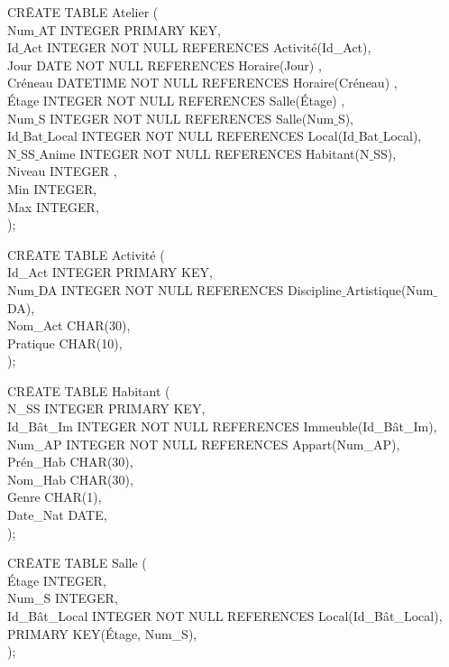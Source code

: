 \documentclass[a4paper,10.5pt]{report}
\begin{document}
		\begin{tabbing}
			CR\=EATE TABLE Atelier (\\
			\> Num$\_$AT INTEGER PRIMARY KEY,\\
			\> Id$\_$Act INTEGER NOT NULL REFERENCES Activité(Id\_Act),\\
            \> Jour DATE NOT NULL REFERENCES Horaire(Jour) ,\\
            \> Créneau DATETIME NOT NULL REFERENCES Horaire(Créneau) ,\\
            \> Étage INTEGER NOT NULL REFERENCES Salle(Étage) ,\\
			\> Num$\_$S INTEGER NOT NULL REFERENCES Salle(Num$\_$S),\\
			\> Id$\_$Bat$\_$Local INTEGER NOT NULL REFERENCES Local(Id$\_$Bat$\_$Local),\\
			\> N$\_$SS$\_$Anime  INTEGER NOT NULL REFERENCES Habitant(N$\_$SS),\\
			\> Niveau INTEGER ,\\
			\> Min INTEGER,\\
			\> Max INTEGER,\\);
		\end{tabbing}

		\begin{tabbing}
			CR\=EATE TABLE Activité (\\
			\> Id\_Act INTEGER PRIMARY KEY,\\
			\> Num$\_$DA INTEGER NOT NULL REFERENCES Discipline$\_$Artistique(Num$\_$DA),\\
			\> Nom\_Act CHAR(30),\\
			\> Pratique CHAR(10),\\);
		\end{tabbing}

		\begin{tabbing}
			CR\=EATE TABLE Habitant (\\
			\> N\_SS INTEGER PRIMARY KEY,\\
			\> Id\_Bât\_Im INTEGER NOT NULL REFERENCES Immeuble(Id\_Bât\_Im),\\
			\> Num\_AP INTEGER NOT NULL REFERENCES Appart(Num\_AP),\\
			\> Prén\_Hab CHAR(30),\\
			\> Nom\_Hab CHAR(30),\\
			\> Genre CHAR(1),\\
			\> Date\_Nat DATE,\\);
		\end{tabbing}

		\begin{tabbing}
			CR\=EATE TABLE Salle (\\
			\> Étage INTEGER,\\
			\> Num\_S INTEGER,\\
			\> Id\_Bât\_Local INTEGER NOT NULL REFERENCES Local(Id\_Bât\_Local),\\
			\> PRIMARY KEY(Étage, Num\_S),\\);
		\end{tabbing}
\end{document}

